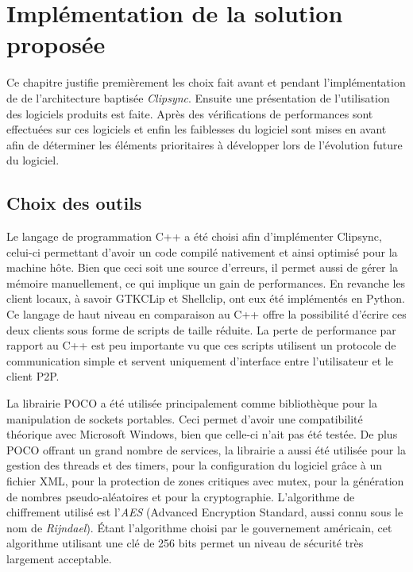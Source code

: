 \chapter{Implémentation de la solution proposée}
\renewcommand{\leftmark}{\thechapter.~~Implémentation de la solution proposée}
\label{chap:implem}
Ce chapitre justifie premièrement les choix fait avant et
pendant l'implémentation de de l'architecture baptisée \emph{Clipsync}.
Ensuite une présentation de l'utilisation des
logiciels produits est faite. Après des vérifications de performances sont
effectuées sur ces logiciels et enfin les faiblesses du logiciel sont mises
en avant afin de déterminer les éléments prioritaires à développer lors de
l'évolution future du logiciel.

\section{Choix des outils}
Le langage de programmation C++ a été choisi afin d'implémenter Clipsync,
celui-ci permettant d'avoir un code compilé nativement et ainsi optimisé
pour la machine hôte. Bien que ceci soit une source d'erreurs, il permet
aussi de gérer la mémoire manuellement, ce qui implique un gain de
performances. En revanche les client locaux, à savoir GTKCLip et Shellclip,
ont eux été implémentés en Python. Ce langage de haut niveau en comparaison
au C++ offre la possibilité d'écrire ces deux clients sous forme de scripts
de taille réduite. La perte de performance par rapport au C++ est peu
importante vu que ces scripts utilisent un protocole de communication simple
et servent uniquement d'interface entre l'utilisateur et le client P2P.

La librairie POCO\cite{poco} a été utilisée principalement comme bibliothèque
pour la manipulation de sockets portables. Ceci permet d'avoir une
compatibilité théorique avec Microsoft Windows, bien que celle-ci n'ait pas
été testée. De plus POCO offrant un grand nombre de services, la librairie
a aussi été utilisée pour la gestion des threads et des timers, pour la
configuration du logiciel grâce à un fichier XML, pour la protection de
zones critiques avec mutex, pour la génération de
nombres pseudo-aléatoires et pour la cryptographie. L'algorithme de chiffrement
utilisé est l'\emph{AES}\cite{daemen2002the} (Advanced Encryption Standard,
aussi connu sous le nom de \emph{Rijndael}). Étant l'algorithme choisi par le
gouvernement américain, cet algorithme utilisant une clé de 256 bits permet un
niveau de sécurité très largement acceptable.

